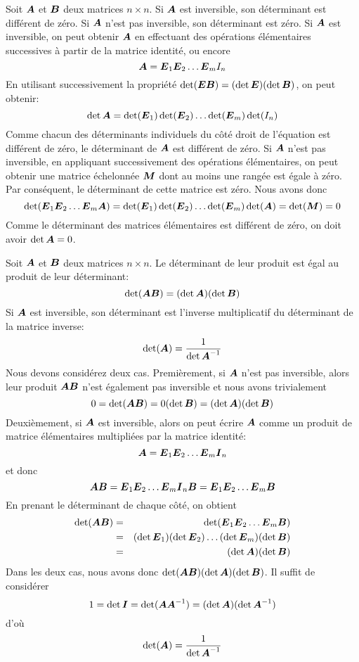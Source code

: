\begin{theo}
\label{det0:inv}
Soit $\boldsymbol{A}$ et $\boldsymbol{B}$ deux matrices $n\times  n$.
 Si $\boldsymbol{A}$ est inversible, son déterminant est différent de zéro.
 Si $\boldsymbol{A}$ n'est pas inversible, son déterminant est zéro.
\proof
{} Si $\boldsymbol{A}$ est inversible, on peut obtenir $\boldsymbol{A}$ en effectuant des opérations
élémentaires successives à partir de la matrice identité, ou encore
\[
\boldsymbol{A} = \boldsymbol{E}_1 \boldsymbol{E}_2 \ldots \boldsymbol{E}_m I_n
\]
En utilisant successivement la propriété $\det(\boldsymbol{E}\boldsymbol{B}) = (\det\boldsymbol{E}) (\det\boldsymbol{B})$, on peut obtenir:
\[
\det \boldsymbol{A} = \det( \boldsymbol{E}_1) \det( \boldsymbol{E}_2) \ldots \det(\boldsymbol{E}_m) \det( I_n)
\]
Comme chacun des déterminants individuels du côté droit de l'équation est différent de zéro, le déterminant
de $\boldsymbol{A}$ est différent de zéro.
 Si $\boldsymbol{A}$ n'est pas inversible, en appliquant successivement des opérations élémentaires, on peut
obtenir une matrice échelonnée $\boldsymbol{M}$ dont au moins une rangée est égale à zéro.  Par conséquent, le 
déterminant de cette matrice est zéro.  Nous avons donc
 \[
 \det (\boldsymbol{E}_1 \boldsymbol{E}_2 \ldots \boldsymbol{E}_m \boldsymbol{A}) = 
 \det( \boldsymbol{E}_1) \det( \boldsymbol{E}_2) \ldots \det(\boldsymbol{E}_m) \det(\boldsymbol{A}) = \det(\boldsymbol{M}) = 0
 \]
 Comme le déterminant des matrices élémentaires est différent de zéro, on doit avoir $\det\boldsymbol{A} = 0$.
 \cqfd
\end{theo}


\begin{theo}
 Soit $\boldsymbol{A}$ et $\boldsymbol{B}$ deux matrices $n\times  n$.  Le déterminant de leur
produit est égal au produit de leur déterminant:
\[
\det(\boldsymbol{A}\boldsymbol{B}) = (\det\boldsymbol{A}) (\det\boldsymbol{B})
\]
 Si $\boldsymbol{A}$ est inversible, son déterminant est l'inverse multiplicatif du déterminant de la matrice inverse:
\[
\det(\boldsymbol{A}) = \frac{1}{\det\boldsymbol{A}^{-1}}
\]
\proof
{} Nous devons considérez deux cas. 
Premièrement, si $\boldsymbol{A}$ n'est pas inversible, alors leur produit $\boldsymbol{A}\boldsymbol{B}$ n'est également pas inversible
et nous avons trivialement
\[
0 = \det(\boldsymbol{A}\boldsymbol{B}) =  0 (\det\boldsymbol{B}) = (\det\boldsymbol{A}) (\det\boldsymbol{B})
\]
Deuxièmement, si $\boldsymbol{A}$ est inversible, alors on peut écrire $\boldsymbol{A}$ comme un produit de matrice élémentaires multipliées par
la matrice identité:
\[
\boldsymbol{A} = \boldsymbol{E}_1 \boldsymbol{E}_2 \ldots \boldsymbol{E}_m \boldsymbol{I}_n
\]
et donc
\[
\boldsymbol{A}\boldsymbol{B} = \boldsymbol{E}_1 \boldsymbol{E}_2 \ldots \boldsymbol{E}_m \boldsymbol{I}_n \boldsymbol{B} = \boldsymbol{E}_1 \boldsymbol{E}_2 \ldots \boldsymbol{E}_m\boldsymbol{B}
\]
En prenant le déterminant de chaque côté, on obtient
\begin{eqnarray*}
\det(\boldsymbol{A}\boldsymbol{B}) &=& \det(\boldsymbol{E}_1\boldsymbol{E}_2\ldots \boldsymbol{E}_m\boldsymbol{B}) \\
&=& (\det\boldsymbol{E}_1) (\det\boldsymbol{E}_2)\ldots (\det\boldsymbol{E}_m) (\det\boldsymbol{B}) \\
&=& (\det\boldsymbol{A})(\det\boldsymbol{B})
\end{eqnarray*}
Dans les deux cas, nous avons donc $\det(\boldsymbol{A}\boldsymbol{B}) (\det\boldsymbol{A}) (\det\boldsymbol{B})$.
\cqfd
{} Il suffit de considérer 
\[
1 = \det\boldsymbol{I} = \det(\boldsymbol{A}\boldsymbol{A}^{-1}) = (\det\boldsymbol{A})(\det\boldsymbol{A}^{-1})
\]
d'où
\[
\det(\boldsymbol{A}) = \frac{1}{\det\boldsymbol{A}^{-1}}
\]
\end{theo}

